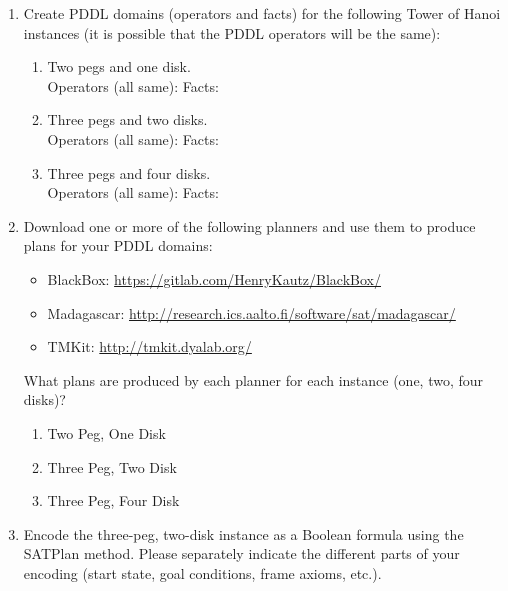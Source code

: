 \documentclass[12pt,letterpaper]{ntdhw}
\begin{document}
\begin{enumerate}
  \item  Create PDDL domains (operators and facts) for the following Tower of
  Hanoi instances (it is possible that the PDDL operators will be the
  same):
  \begin{enumerate}
    \item Two pegs and one disk. \\
    Operators (all same):
    Facts:
    \item Three pegs and two disks. \\
    Operators (all same):
    Facts:
    \item Three pegs and four disks. \\
    Operators (all same):
    Facts:
  \end{enumerate}

  \item  Download one or more of the following planners and use them to
  produce plans for your PDDL domains:
  \begin{itemize}
    \item BlackBox:
    \url{https://gitlab.com/HenryKautz/BlackBox/}
    \item Madagascar:
    \url{http://research.ics.aalto.fi/software/sat/madagascar/}
    \item TMKit:
    \url{http://tmkit.dyalab.org/}
  \end{itemize}
  What plans are produced by each planner for each instance (one, two,
  four disks)?

    \begin{enumerate}
        \item Two Peg, One Disk \\
        \item Three Peg, Two Disk
        \item Three Peg, Four Disk
    \end{enumerate}

    \item  Encode the three-peg, two-disk instance as a Boolean formula using the
    SATPlan method.  Please separately indicate the different parts of your
    encoding (start state, goal conditions, frame axioms, etc.).


\end{enumerate}
\end{document}
